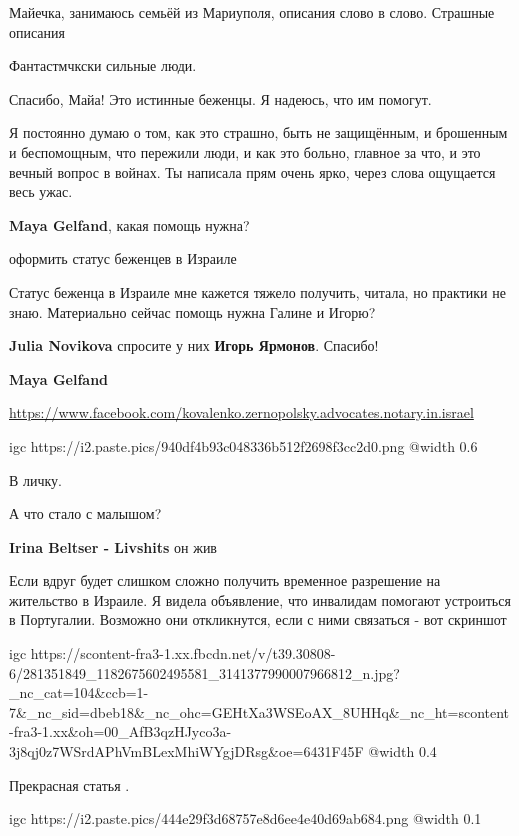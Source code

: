 
Майечка, занимаюсь семьёй из Мариуполя, описания слово в слово. Страшные описания


Фантастмчкски сильные люди.


Спасибо, Майа! Это истинные беженцы. Я надеюсь, что им помогут.


Я постоянно думаю о том, как это страшно, быть не защищённым, и брошенным и
беспомощным, что пережили люди, и как это больно, главное за что, и это вечный
вопрос в войнах. Ты написала прям очень ярко, через слова ощущается весь ужас.

\textbf{Maya Gelfand}, какая помощь нужна?

\begin{itemize} %

оформить статус беженцев в Израиле


Статус беженца в Израиле мне кажется тяжело получить, читала, но практики не знаю. Материально сейчас помощь нужна Галине и Игорю?

\textbf{Julia Novikova} спросите у них \textbf{Игорь Ярмонов}. Спасибо!

\textbf{Maya Gelfand}

\url{https://www.facebook.com/kovalenko.zernopolsky.advocates.notary.in.israel}

\ifcmt
  igc https://i2.paste.pics/940df4b93c048336b512f2698f3cc2d0.png
	@width 0.6
\fi


\end{itemize} %


В личку.


А что стало с малышом?

\begin{itemize} %
\textbf{Irina Beltser - Livshits} он жив
\end{itemize} %


Если вдруг будет слишком сложно получить временное разрешение на жительство в
Израиле. Я видела объявление, что инвалидам помогают устроиться в Португалии.
Возможно они откликнутся, если с ними связаться - вот скриншот

\ifcmt
  igc https://scontent-fra3-1.xx.fbcdn.net/v/t39.30808-6/281351849_1182675602495581_3141377990007966812_n.jpg?_nc_cat=104&ccb=1-7&_nc_sid=dbeb18&_nc_ohc=GEHtXa3WSEoAX_8UHHq&_nc_ht=scontent-fra3-1.xx&oh=00_AfB3qzHJyco3a-3j8qj0z7WSrdAPhVmBLexMhiWYgjDRsg&oe=6431F45F
	@width 0.4
\fi


Прекрасная статья .

\ifcmt
  igc https://i2.paste.pics/444e29f3d68757e8d6ee4e40d69ab684.png
	@width 0.1
\fi
